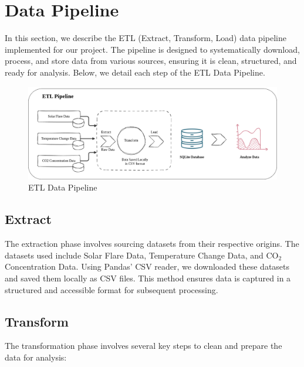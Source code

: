 \documentclass{article}
\begin{document}
\section{Data Pipeline}

In this section, we describe the ETL (Extract, Transform, Load) data pipeline implemented for our project. The pipeline is designed to systematically download, process, and store data from various sources, ensuring it is clean, structured, and ready for analysis. Below, we detail each step of the ETL Data Pipeline.

\begin{figure}[h]
    \centering
    \includegraphics[width=1\textwidth]{ETL.png} %
    \caption{ETL Data Pipeline}
    \label{fig:example}
\end{figure}

\subsection{Extract}

The extraction phase involves sourcing datasets from their respective origins. The datasets used include Solar Flare Data, Temperature Change Data, and CO$_2$ Concentration Data. Using Pandas' CSV reader, we downloaded these datasets and saved them locally as CSV files. This method ensures data is captured in a structured and accessible format for subsequent processing.

\subsection{Transform}
The transformation phase involves several key steps to clean and prepare the data for analysis:
\end{document}

